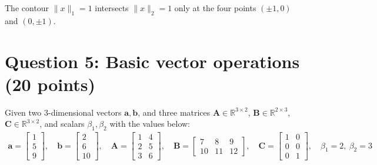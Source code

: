 \documentclass[11pt]{article}
\begin{document}
The contour $\|x\|_1=1$ intersects $\|x\|_2=1$ only at the four points
$(\pm1,0)$ and $(0,\pm1)$. 


\newpage
\section*{Question 5: Basic vector operations (20 points)}

Given two 3-dimensional vectors $\mathbf{a}, \mathbf{b}$, and three matrices $\mathbf{A} \in \mathbb{R}^{3 \times 2}$, $\mathbf{B} \in \mathbb{R}^{2 \times 3}$, $\mathbf{C} \in \mathbb{R}^{3 \times 2}$, and scalars $\beta_1, \beta_2$ with the values below:
\begin{gather*}
    \mathbf{a} = \begin{bmatrix} 1 \\ 5 \\ 9 \end{bmatrix},\quad
    \mathbf{b} = \begin{bmatrix} 2 \\ 6 \\ 10 \end{bmatrix},\quad
    \mathbf{A} = \begin{bmatrix} 1 & 4 \\ 2 & 5 \\ 3 & 6 \end{bmatrix},\quad
    \mathbf{B} = \begin{bmatrix} 7 & 8 & 9 \\ 10 & 11 & 12 \end{bmatrix},\quad
    \mathbf{C} = \begin{bmatrix} 1 & 0 \\ 0 & 0 \\ 0 & 1 \end{bmatrix},\quad
    \beta_1 = 2,\ \beta_2 = 3
\end{gather*}
\end{document}
